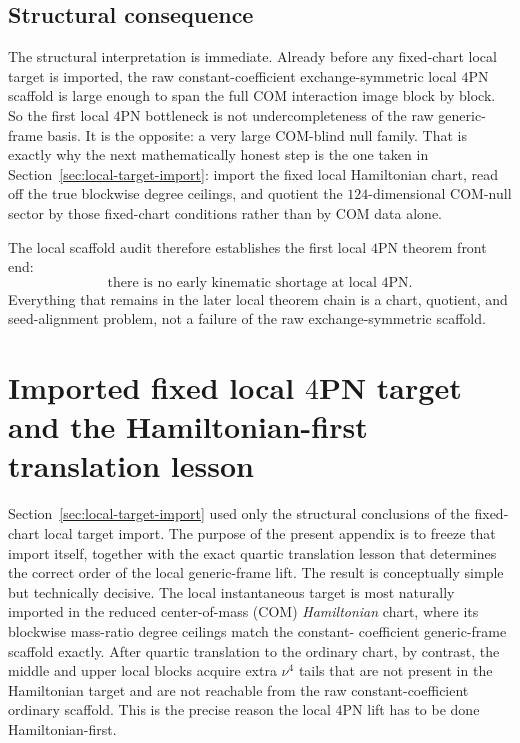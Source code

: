 \documentclass[11pt]{article}
\begin{document}
\subsection{Structural consequence}
\label{app:local-generic-frame-scaffold-consequence}

The structural interpretation is immediate.  Already before any fixed-chart
local target is imported, the raw constant-coefficient exchange-symmetric local
$4$PN scaffold is large enough to span the full COM interaction image block by
block.  So the first local $4$PN bottleneck is not undercompleteness of the raw
generic-frame basis.  It is the opposite: a very large COM-blind null family.
That is exactly why the next mathematically honest step is the one taken in
Section~\ref{sec:local-target-import}: import the fixed local Hamiltonian
chart, read off the true blockwise degree ceilings, and quotient the
$124$-dimensional COM-null sector by those fixed-chart conditions rather than by
COM data alone.

The local scaffold audit therefore establishes the first local $4$PN theorem
front end:
\begin{equation}
\boxed{
\text{there is no early kinematic shortage at local }4\text{PN.}
}
\label{eq:app-4pn-local-scaffold-no-shortage}
\end{equation}
Everything that remains in the later local theorem chain is a chart, quotient,
and seed-alignment problem, not a failure of the raw exchange-symmetric
scaffold.


\section{Imported fixed local \texorpdfstring{$4$}{4}PN target and the Hamiltonian-first translation lesson}
\label{app:imported-local-target-hamiltonian-first}

Section~\ref{sec:local-target-import} used only the structural conclusions of the
fixed-chart local target import.  The purpose of the present appendix is to
freeze that import itself, together with the exact quartic translation lesson
that determines the correct order of the local generic-frame lift.  The result
is conceptually simple but technically decisive.  The local instantaneous target
is most naturally imported in the reduced center-of-mass (COM) \emph{Hamiltonian}
chart, where its blockwise mass-ratio degree ceilings match the constant-
coefficient generic-frame scaffold exactly.  After quartic translation to the
ordinary chart, by contrast, the middle and upper local blocks acquire extra
\(\nu^4\) tails that are not present in the Hamiltonian target and are not
reachable from the raw constant-coefficient ordinary scaffold.  This is the
precise reason the local \(4\)PN lift has to be done Hamiltonian-first.
\end{document}
